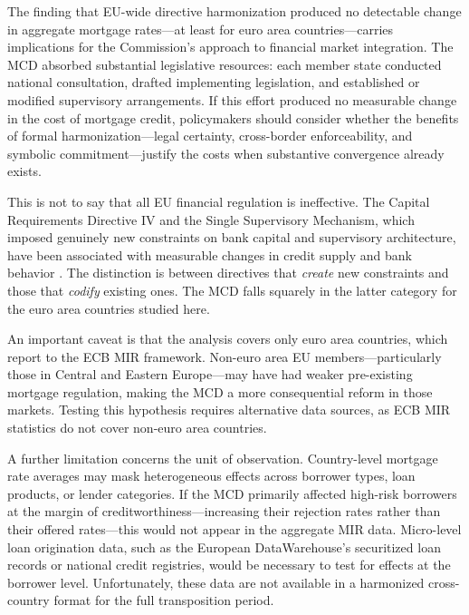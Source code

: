 \documentclass[12pt]{article}
\begin{document}
The finding that EU-wide directive harmonization produced no detectable change in aggregate mortgage rates---at least for euro area countries---carries implications for the Commission's approach to financial market integration. The MCD absorbed substantial legislative resources: each member state conducted national consultation, drafted implementing legislation, and established or modified supervisory arrangements. If this effort produced no measurable change in the cost of mortgage credit, policymakers should consider whether the benefits of formal harmonization---legal certainty, cross-border enforceability, and symbolic commitment---justify the costs when substantive convergence already exists.

This is not to say that all EU financial regulation is ineffective. The Capital Requirements Directive IV and the Single Supervisory Mechanism, which imposed genuinely new constraints on bank capital and supervisory architecture, have been associated with measurable changes in credit supply and bank behavior \citep{jimenez_2017_macropru, acharya_2019_whatever}. The distinction is between directives that \textit{create} new constraints and those that \textit{codify} existing ones. The MCD falls squarely in the latter category for the euro area countries studied here.

An important caveat is that the analysis covers only euro area countries, which report to the ECB MIR framework. Non-euro area EU members---particularly those in Central and Eastern Europe---may have had weaker pre-existing mortgage regulation, making the MCD a more consequential reform in those markets. Testing this hypothesis requires alternative data sources, as ECB MIR statistics do not cover non-euro area countries.

A further limitation concerns the unit of observation. Country-level mortgage rate averages may mask heterogeneous effects across borrower types, loan products, or lender categories. If the MCD primarily affected high-risk borrowers at the margin of creditworthiness---increasing their rejection rates rather than their offered rates---this would not appear in the aggregate MIR data. Micro-level loan origination data, such as the European DataWarehouse's securitized loan records or national credit registries, would be necessary to test for effects at the borrower level. Unfortunately, these data are not available in a harmonized cross-country format for the full transposition period.
\end{document}

